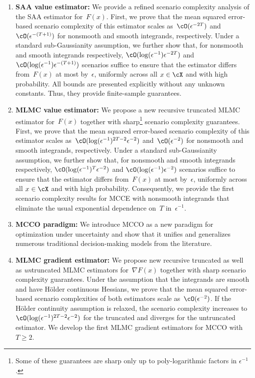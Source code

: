 \documentclass[11pt]{article}
\begin{document}
\begin{enumerate}
    
    \item {\bf SAA value estimator:} We provide a refined scenario complexity analysis of the SAA estimator for~$F(x)$. First, we prove that the mean squared error-based scenario complexity of this estimator scales as~$\cO(\epsilon^{-2T})$ and $\cO(\epsilon^{-(T+1)})$ for nonsmooth and smooth integrands, respectively. Under a standard sub-Gaussianity assumption, we further show that, for nonsmooth and smooth integrands respectively, $\cO(\log(\epsilon^{-1})\epsilon^{-2T})$ and $\cO(\log(\epsilon^{-1})\epsilon^{-(T+1)})$ scenarios suffice to ensure that the estimator differs from~$F(x)$ at most by~$\epsilon$, uniformly across all $x\in\cX$ and with high probability. All bounds are presented explicitly without any unknown constants. Thus, they provide finite-sample guarantees. 
    
    \item {\bf MLMC value estimator:} We propose a new recursive truncated MLMC estimator for~$F(x)$ together with sharp\footnote{Some of these guarantees are sharp only up to poly-logarithmic factors in $\epsilon^{-1}$.} scenario complexity guarantees. First, we prove that the mean squared error-based scenario complexity of this estimator scales as~$\cO(\log(\epsilon^{-1})^{2T-2}\epsilon^{-2})$ and~$\cO(\epsilon^{-2})$ for nonsmooth and smooth integrands, respectively. Under a standard sub-Gaussianity assumption, we further show that, for nonsmooth and smooth integrands respectively, $\cO(\log(\epsilon^{-1})^{T}\epsilon^{-2})$ and $\cO(\log(\epsilon^{-1})\epsilon^{-2})$ scenarios suffice to ensure that the estimator differs from~$F(x)$ at most by~$\epsilon$, uniformly across all $x\in\cX$ and with high probability. Consequently, we provide the first scenario complexity results for MCCE with nonsmooth integrands that eliminate the usual exponential dependence on~$T$ in~$\epsilon^{-1}$.
    
    \item {\bf MCCO paradigm:} We introduce MCCO as a new paradigm for optimization under uncertainty and show that it unifies and generalizes numerous traditional decision-making models from the literature.
    
    \item {\bf MLMC gradient estimator:} We propose new recursive truncated as well as {\em un}truncated MLMC estimators for~$\nabla F(x)$ together with sharp scenario complexity guarantees. Under the assumption that the integrands are smooth and have H\"older continuous Hessians, we prove that the mean squared error-based scenario complexities of both estimators scale as~$\cO(\epsilon^{-2})$. If the Hölder continuity assumption is relaxed, the scenario complexity increases to~$\cO(\log(\epsilon^{-1})^{2T-2}\epsilon^{-2})$ for the truncated and diverges for the untruncated estimator. We develop the first MLMC gradient estimators for MCCO with $T\geq 2$. 
    

\end{enumerate}
\end{document}
